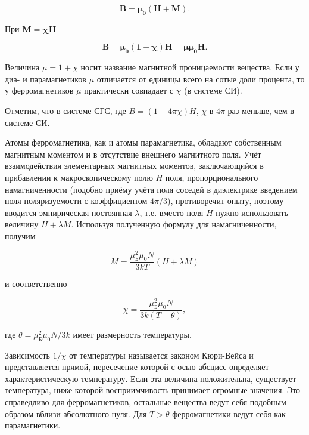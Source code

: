 \begin{equation*}
	\mathbf{B = \mu_0 (H + M)}.
\end{equation*}

При $\mathbf{M = \chi H}$

\begin{equation}
	\mathbf{B = \mu_0 (1 + \chi)H = \mu \mu_0 H}.
\end{equation}

Величина $\mu = 1+ \chi$ носит название магнитной проницаемости вещества. Если у диа- и парамагнетиков $\mu$ отличается от единицы всего на сотые доли процента, то у ферромагнетиков $\mu$ практически совпадает с $\chi$ (в системе СИ).

Отметим, что в системе СГС, где $B = (1 + 4\pi \chi) H$, $\chi$ в $4\pi$ раз меньше, чем в системе СИ.

Атомы ферромагнетика, как и атомы парамагнетика, обладают собственным магнитным моментом и в отсутствие внешнего магнитного поля. Учёт взаимодействия  элементарных магнитных моментов, заключающийся в прибавлении к макроскопическому полю $H$ поля, пропорционального намагниченности (подобно приёму учёта поля соседей в диэлектрике введением поля поляризуемости с коэффициентом $4\pi/3$), противоречит опыту, поэтому вводится эмпирическая постоянная $\lambda$, т.е. вместо поля $H$ нужно использовать величину $H + \lambda M$.  Используя полученную формулу для намагниченности, получим

\begin{equation*}
	M = \frac{\mu_{\text{Б}}^2 \mu_0 N}{3kT}(H + \lambda M)
\end{equation*}

и соответственно

\begin{equation*}
	\chi = \frac{\mu_{\text{Б}}^2 \mu_0 N}{3k(T - \theta)},
\end{equation*}

где $\theta = \mu_{\text{Б}}^2 \mu_0 N / 3k$ имеет размерность температуры.

Зависимость  $1/\chi$  от температуры называется законом Кюри-Вейса и представляется прямой, пересечение которой с осью абсцисс определяет характеристическую температуру. Если эта величина положительна, существует температура, ниже которой восприимчивость принимает огромные значения. Это справедливо для ферромагнетиков, остальные вещества ведут себя подобным образом  вблизи абсолютного нуля. Для $T>\theta$ ферромагнетики ведут себя как парамагнетики.

